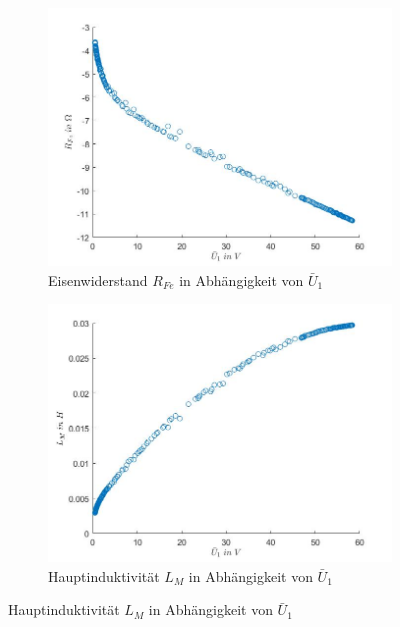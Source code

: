 \documentclass[a4paper, 12pt,]{scrartcl}
\begin{document}
\begin{figure}[H]\centering
\begin{adjustwidth}{-1em}{7em}
  \begin{subfigure}[b]{0.5\textwidth}
    \includegraphics[width=\textwidth]{U1RFe1}
    \caption{Eisenwiderstand $R_{Fe}$ in Abhängigkeit von $\bar{U}_1$}
    \label{fig:}
  \end{subfigure}
  \begin{subfigure}[b]{0.5\textwidth}
    \includegraphics[width=\textwidth]{U1LM1}
    \caption{Hauptinduktivität $L_M$ in Abhängigkeit von $\bar{U}_1$}
    \label{fig:}
  \end{subfigure}
\end{adjustwidth}\centering

\end{figure}
\end{document}
